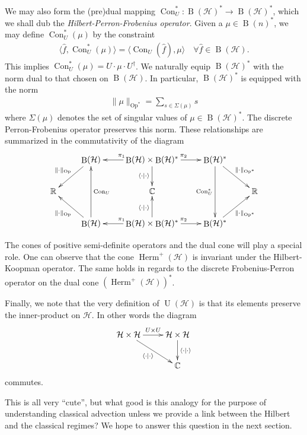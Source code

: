 \documentclass[12pt]{amsart}
\renewcommand{\H}{\ensuremath{\mathcal{H}}}
\DeclareMathOperator{\U}{U}
\DeclareMathOperator{\B}{B}
\DeclareMathOperator{\Herm}{Herm}
\DeclareMathOperator{\Op}{Op}
\DeclareMathOperator{\Con}{Con}
\begin{document}
We may also form the (pre)dual mapping $\Con_U^*: \B(\H)^* \to \B(\H)^*$,
which we shall dub the \emph{Hilbert-Perron-Frobenius operator}.
Given a $\mu \in \B(n)^*$, we may define $\Con_U^*(\mu)$ by the constraint
\begin{align*}
	\langle \hat{f} , \Con_U^*(\mu) \rangle = \langle \Con_U(\hat{f}) , \mu \rangle \quad \forall \hat{f} \in \B(\H).
\end{align*}
This implies $\Con_U^*(\mu) = U \cdot \mu \cdot U^\dagger$.
We naturally equip $\B(\H)^*$ with the norm dual to that chosen on $\B(\H)$.
In particular, $\B(\H)^*$ is  equipped with the norm
\begin{align*}
	\| \mu \|_{\Op^*} = \sum_{s \in \Sigma(\mu) } s
\end{align*}
where $\Sigma(\mu)$ denotes the set of singular values of $\mu \in \B(\H)^*$.
The discrete Perron-Frobenius operator preserves this norm.
These relationships are summarized in the commutativity of the diagram
\begin{equation} \label{cd:quantum_duality}
	\xymatrix{
		& \ar[dl]_{\| \cdot \|_{\Op}} \B(\H) & \ar[l]_{\pi_1} \B(\H)\times \B(\H)^* \ar[d]_{\langle \cdot \mid \cdot \rangle} \ar[r]^{\pi_2} & \B(\H)^*   \ar[dd]_{\Con_U^*} \ar[dr]^{\| \cdot \|_{\Op^*}}& \\
		\mathbb{R} && \mathbb{C} && \mathbb{R} \\
		& \ar[ul]^{\| \cdot \|_{\Op}} \B(\H) \ar[uu]_{\Con_U} & \ar[l]_{\pi_1} \B(\H)\times \B(\H)^* \ar[u]^{\langle \cdot \mid \cdot \rangle} \ar[r]^{\pi_2} & \B(\H)^* \ar[ur]_{\| \cdot \|_{\Op^*}} &	
	}
\end{equation}

The cones of positive semi-definite operators and the dual cone will play a special role.
One can observe that the cone $\Herm^+(\H)$ is invariant under the Hilbert-Koopman operator.
The same holds in regards to the discrete Frobenius-Perron operator on the dual cone $(\Herm^+(\H))^*$.

Finally, we note that the very definition of $\U(\H)$ is that its elements preserve the inner-product on $\H$.
In other words the diagram
\begin{equation*}
	\xymatrix{
		\H \times \H \ar[dr]_{\langle \cdot \mid \cdot \rangle} \ar[r]^{ U \times U} & \H \times \H \ar[d]^{\langle \cdot \mid \cdot \rangle} \\
		&\mathbb{C}
	}
\end{equation*}
commutes.

This is all very ``cute'', but what good is this analogy for the purpose of understanding
classical advection
unless we provide a link between the Hilbert and the classical regimes?
We hope to answer this question in the next section.
\end{document}
